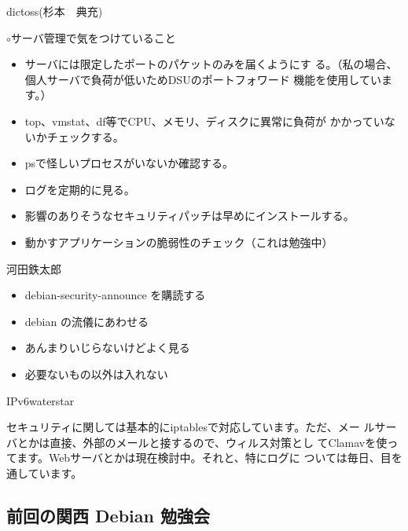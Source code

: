 \documentclass[mingoth,a4paper]{jsarticle}
\begin{document}
\begin{prework*}{ dictoss(杉本　典充) }
    
    $\circ$サーバ管理で気をつけていること
    \begin{itemize}
          \item サーバには限定したポートのパケットのみを届くようにす
        る。（私の場合、個人サーバで負荷が低いためDSUのポートフォワード
        機能を使用しています。）
          \item top、vmstat、df等でCPU、メモリ、ディスクに異常に負荷が
        かかっていないかチェックする。
          \item psで怪しいプロセスがいないか確認する。
          \item ログを定期的に見る。
          \item 影響のありそうなセキュリティパッチは早めにインストールする。
          \item 動かすアプリケーションの脆弱性のチェック（これは勉強中）
    \end{itemize}
    
\end{prework*}

\begin{prework*}{ 河田鉄太郎 }

    \begin{itemize}
          \item debian-security-announce を購読する
          \item debian の流儀にあわせる
          \item あんまりいじらないけどよく見る
          \item 必要ないもの以外は入れない
    \end{itemize}
    
\end{prework*}

\begin{prework*}{ IPv6waterstar }
    
    セキュリティに関しては基本的にiptablesで対応しています。ただ、メー
    ルサーバとかは直接、外部のメールと接するので、ウィルス対策とし
    てClamavを使ってます。Webサーバとかは現在検討中。それと、特にログに
    ついては毎日、目を通しています。
\end{prework*}



\subsection{前回の関西 Debian 勉強会}
\end{document}
